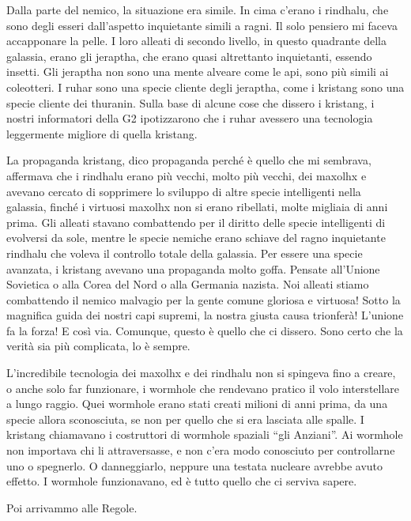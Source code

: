 Dalla parte del nemico, la situazione era simile. In cima c'erano i
rindhalu, che sono degli esseri dall'aspetto inquietante simili a ragni.
Il solo pensiero mi faceva accapponare la pelle. I loro alleati di
secondo livello, in questo quadrante della galassia, erano gli jeraptha,
che erano quasi altrettanto inquietanti, essendo insetti. Gli jeraptha
non sono una mente alveare come le api, sono più simili ai coleotteri. I
ruhar sono una specie cliente degli jeraptha, come i kristang sono una
specie cliente dei thuranin. Sulla base di alcune cose che dissero i
kristang, i nostri informatori della G2 ipotizzarono che i ruhar
avessero una tecnologia leggermente migliore di quella kristang.

La propaganda kristang, dico propaganda perché è quello che mi sembrava,
affermava che i rindhalu erano più vecchi, molto più vecchi, dei maxolhx
e avevano cercato di sopprimere lo sviluppo di altre specie intelligenti
nella galassia, finché i virtuosi maxolhx non si erano ribellati, molte
migliaia di anni prima. Gli alleati stavano combattendo per il diritto
delle specie intelligenti di evolversi da sole, mentre le specie nemiche
erano schiave del ragno inquietante rindhalu che voleva il controllo
totale della galassia. Per essere una specie avanzata, i kristang
avevano una propaganda molto goffa. Pensate all'Unione Sovietica o alla
Corea del Nord o alla Germania nazista. Noi alleati stiamo combattendo
il nemico malvagio per la gente comune gloriosa e virtuosa! Sotto la
magnifica guida dei nostri capi supremi, la nostra giusta causa
trionferà! L'unione fa la forza! E così via. Comunque, questo è quello
che ci dissero. Sono certo che la verità sia più complicata, lo è
sempre.

L'incredibile tecnologia dei maxolhx e dei rindhalu non si spingeva fino
a creare, o anche solo far funzionare, i wormhole che rendevano pratico
il volo interstellare a lungo raggio. Quei wormhole erano stati creati
milioni di anni prima, da una specie allora sconosciuta, se non per
quello che si era lasciata alle spalle. I kristang chiamavano i
costruttori di wormhole spaziali ``gli Anziani''. Ai wormhole non
importava chi li attraversasse, e non c'era modo conosciuto per
controllarne uno o spegnerlo. O danneggiarlo, neppure una testata
nucleare avrebbe avuto effetto. I wormhole funzionavano, ed è tutto
quello che ci serviva sapere.

Poi arrivammo alle Regole.

